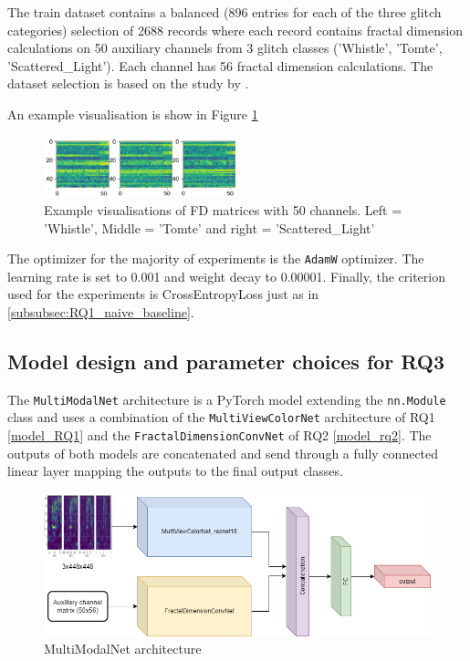 The train dataset contains a balanced (896 entries for each of the three glitch categories) selection of 2688 records where each record contains fractal dimension calculations on 50 auxiliary channels from 3 glitch classes ('Whistle', 'Tomte', 'Scattered\_Light'). Each channel has 56 fractal dimension calculations. The dataset selection is based on the study by \citep{laguarta2023detection}.

An example visualisation is show in Figure \ref{fig:FD_visualisation}
\begin{figure}[ht]
    \centering
    \includegraphics[width=0.5\textwidth]{Grad Assignment/Images/FD_visualisation_50channels.png}
    \caption{Example visualisations of FD matrices with 50 channels. Left = 'Whistle', Middle = 'Tomte' and right = 'Scattered\_Light'}
    \label{fig:FD_visualisation}
\end{figure}

The optimizer for the majority of experiments is the \verb|AdamW| optimizer. The learning rate is set to 0.001 and weight decay to 0.00001. Finally, the criterion used for the experiments is CrossEntropyLoss just as in \ref{subsubsec:RQ1_naive_baseline}. 
\newpage
\subsection{Model design and parameter choices for RQ3}
\label{model_RQ3}
The \verb|MultiModalNet| architecture is a PyTorch model extending the \newline \verb|nn.Module| class and uses a combination of the \verb|MultiViewColorNet| architecture of RQ1 \ref{model_RQ1} and the \verb|FractalDimensionConvNet| of RQ2 \ref{model_rq2}. 
The outputs of both models are concatenated and send through a fully connected linear layer mapping the outputs to the final output classes. 

\begin{figure}[H]
    \centering
    \includegraphics[width=1.0\textwidth]{Images/MultiModal_architecture.drawio.png}
    \caption{MultiModalNet architecture}
    \label{fig:MultiModal_architecture}
\end{figure}

